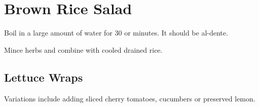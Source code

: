 \section{Brown Rice Salad}
\begin{recipe}



Boil in a large amount of water for 30 or minutes. It should be al-dente.


Mince herbs and combine with cooled drained rice.

\subsection{Lettuce Wraps}

Variations include adding sliced cherry tomatoes, cucumbers or preserved lemon.

\end{recipe}
